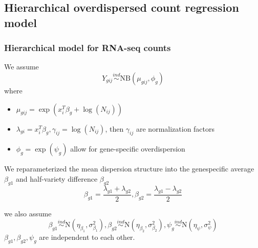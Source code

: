 \documentclass[handout,10pt]{beamer}
\newcommand{\ind}{\stackrel{ind}{\sim}}
\begin{document}
\subsection{Hierarchical overdispersed count regression model}

\begin{frame}
\frametitle{Hierarchical model for RNA-seq counts}

We assume 
\[ 
Y_{gij} \ind \text{NB} \left (\mu_{gij}, \phi_g \right )
\]
\pause
where 
\begin{itemize}[<+->]
\item $\mu_{gij} = \exp(x_i^T\beta_g + \log(N_{ij}))$
\item $\lambda_{gi} = x_i^T\beta_g, \gamma_{ij} = \log(N_{ij})$, then $\gamma_{ij}$ are normalization factors
\item $\phi_{g} = \exp(\psi_g)$ allow for gene-specific overdispersion
\end{itemize}

We reparameterized the mean dispersion structure into the genespecific average $\beta_{g1}$ and half-variety difference $\beta_{g2}$ 
\[ 
\beta_{g1} = \frac{\lambda_{g1}+\lambda_{g2}}{2}, \beta_{g2} = \frac{\lambda_{g1}-\lambda_{g2}}{2}
\]

we also assume 
\[ 
\beta_{g1}  \ind \text{N} \left ( \eta_{\beta_{1}}, \sigma^2_{\beta_1} \right ), 
\beta_{g2} \ind \text{N} \left ( \eta_{\beta_2}, \sigma^2_{\beta_2} \right ),
\psi_g \ind \text{N} \left (\eta_{\psi} , \sigma^2_{\psi}  \right )
\]
$\beta_{g1}, \beta_{g2}, \psi_g$ are independent to each other.

\end{frame}
\end{document}
